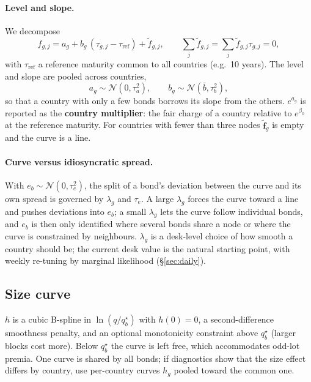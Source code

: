 \documentclass[11pt,a4paper]{article}
\theoremstyle{definition}
\theoremstyle{remark}
\newcommand{\bff}{\bm{f}}
\begin{document}
\paragraph{Level and slope.} We decompose
\begin{equation}\label{eq:levelslope}
f_{g,j}=a_g+b_g\,(\tau_{g,j}-\tau_{\mathrm{ref}})+\tilde f_{g,j},\qquad \sum_j\tilde f_{g,j}=\sum_j\tilde f_{g,j}\tau_{g,j}=0,
\end{equation}
with $\tau_{\mathrm{ref}}$ a reference maturity common to all countries (e.g.\ 10 years). The level and slope are pooled across countries,
\[
a_g\sim\mathcal N(0,\tau_a^2),\qquad b_g\sim\mathcal N(\bar b,\tau_b^2),
\]
so that a country with only a few bonds borrows its slope from the others. $e^{a_g}$ is reported as the \textbf{country multiplier}: the fair charge of a country relative to $e^{\beta_0}$ at the reference maturity. For countries with fewer than three nodes $\tilde{\bff}_g$ is empty and the curve is a line.

\paragraph{Curve versus idiosyncratic spread.} With $e_b\sim\mathcal N(0,\tau_e^2)$, the split of a bond's deviation between the curve and its own spread is governed by $\lambda_g$ and $\tau_e$. A large $\lambda_g$ forces the curve toward a line and pushes deviations into $e_b$; a small $\lambda_g$ lets the curve follow individual bonds, and $e_b$ is then only identified where several bonds share a node or where the curve is constrained by neighbours. $\lambda_g$ is a desk-level choice of how smooth a country should be; the current desk value is the natural starting point, with weekly re-tuning by marginal likelihood (\S\ref{sec:daily}).

\subsection{Size curve}
$h$ is a cubic B-spline in $\ln(q/q^\star_b)$ with $h(0)=0$, a second-difference smoothness penalty, and an optional monotonicity constraint above $q^\star_b$ (larger blocks cost more). Below $q^\star_b$ the curve is left free, which accommodates odd-lot premia. One curve is shared by all bonds; if diagnostics show that the size effect differs by country, use per-country curves $h_g$ pooled toward the common one.
\end{document}
